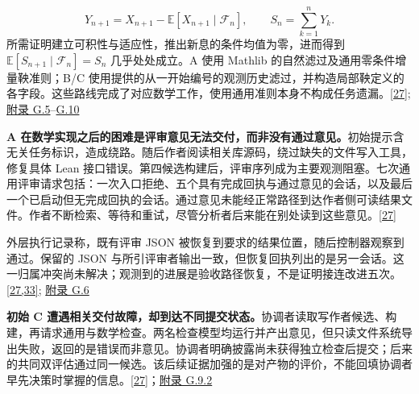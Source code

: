 \[
Y_{n+1}=X_{n+1}-\mathbb E[X_{n+1}\mid\mathcal F_n],\qquad
S_n=\sum_{k=1}^{n}Y_k.
\]
所需证明建立可积性与适应性，推出新息的条件均值为零，进而得到 $\mathbb E[S_{n+1}\mid\mathcal F_n]=S_n$ 几乎处处成立。A 使用 Mathlib 的自然滤过及通用零条件增量鞅准则；B/C 使用提供的从一开始编号的观测历史滤过，并构造局部鞅定义的各字段。这些路线完成了对应数学工作，使用通用准则本身不构成任务遗漏。\href{zh.pdf\#ref-27}{\mbox{[27]}}; \href{zh-appendix.pdf\#g5}{附录 G.5}–\href{zh-appendix.pdf\#g10}{G.10}

\textbf{A 在数学实现之后的困难是评审意见无法交付，而非没有通过意见。}初始提示含无关任务标识，造成绕路。随后作者阅读相关库源码，绕过缺失的文件写入工具，修复具体 Lean 接口错误。第四候选构建后，评审序列成为主要观测阻塞。七次通用评审请求包括：一次入口拒绝、五个具有完成回执与通过意见的会话，以及最后一个已启动但无完成回执的会话。通过意见未能经正常路径到达作者侧可读结果文件。作者不断检索、等待和重试，尽管分析者后来能在别处读到这些意见。\href{zh.pdf\#ref-27}{\mbox{[27]}}

外层执行记录称，既有评审 JSON 被恢复到要求的结果位置，随后控制器观察到通过。保留的 JSON 与所引评审者输出一致，但恢复回执列出的是另一会话。这一归属冲突尚未解决；观测到的进展是验收路径恢复，不是证明接连改进五次。\href{zh.pdf\#ref-27}{\mbox{[27,33]}}; \href{zh-appendix.pdf\#g6}{附录 G.6}

\textbf{初始 C 遭遇相关交付故障，却到达不同提交状态。}协调者读取写作者候选、构建，再请求通用与数学检查。两名检查模型均运行并产出意见，但只读文件系统导出失败，返回的是错误而非意见。协调者明确披露尚未获得独立检查后提交；后来的共同双评估通过同一候选。该后续证据加强的是对产物的评价，不能回填协调者早先决策时掌握的信息。\href{zh.pdf\#ref-27}{\mbox{[27]}}；\href{zh-appendix.pdf\#g9-2}{附录 G.9.2}

